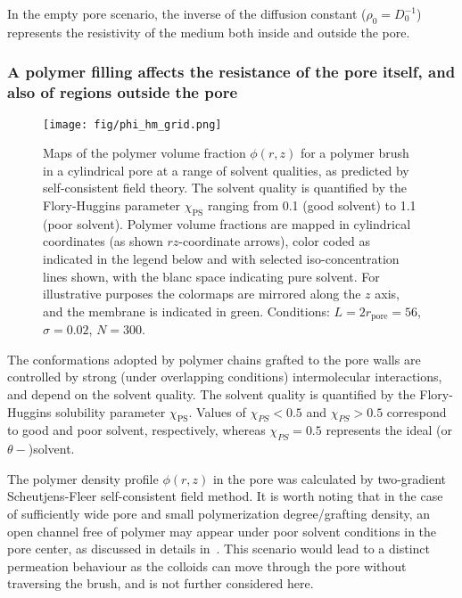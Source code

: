 \documentclass[12pt, a4paper]{article}
\begin{document}
In the empty pore scenario, the inverse of the diffusion constant ($\rho_0=D_0^{-1}$) represents the resistivity of the medium both inside and outside the pore. 

\subsubsection{A polymer filling affects the resistance of the pore itself, and also of regions outside the pore}

\begin{figure}
    \centering
    \texttt{[image: fig/phi\_hm\_grid.png]}
    \caption{
    Maps of the polymer volume fraction $\phi(r,z)$ for a polymer brush in a cylindrical pore at a range of solvent qualities, as predicted by self-consistent field theory. 
    The solvent quality is quantified by the Flory-Huggins parameter $\chi_{\text{PS}}$ ranging from 0.1 (good solvent) to 1.1 (poor solvent).
    Polymer volume fractions are mapped in cylindrical coordinates (as shown $rz$-coordinate arrows), color coded as indicated in the legend below and with selected iso-concentration lines shown, with the blanc space indicating pure solvent.
    For illustrative purposes the colormaps are mirrored along the $z$ axis, and the membrane is indicated in green.
    Conditions: $L=2r_{\text{pore}}=56$, $\sigma=0.02$, $N=300$.
    }
    \label{fig:phi_hm_grid}
\end{figure}

The conformations adopted by polymer chains grafted to the pore walls are controlled by strong (under overlapping conditions) intermolecular interactions, and depend on the solvent quality. 
The solvent quality is quantified by the Flory-Huggins solubility parameter $\chi_{\text{PS}}$. 
Values of $\chi_{PS}<0.5$ and $\chi_{PS}>0.5$ correspond to good and poor solvent, respectively, whereas $\chi_{PS}=0.5$ represents the ideal (or $\theta-$)solvent.

The polymer density profile $\phi(r,z)$ in the pore was calculated by two-gradient Scheutjens-Fleer self-consistent field method.
It is worth noting that in the case of sufficiently wide pore and small polymerization degree/grafting density, 
an open channel free of polymer may appear under poor solvent conditions in the pore center, as discussed in details in~\cite{Laktionov2021}. 
This scenario would lead to a distinct permeation behaviour as the colloids can move through the pore without traversing the brush, and is not further considered here. 
\end{document}
